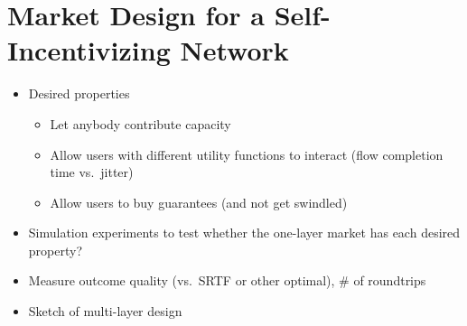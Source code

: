 \section{Market Design for a Self-Incentivizing Network}
\label{sec:designs}

\begin{itemize}

\item Desired properties

\begin{itemize}

\item Let anybody contribute capacity

\item Allow users with different utility functions to interact (flow completion time vs.~jitter)

\item Allow users to buy guarantees (and not get swindled)

\end{itemize}

\item Simulation experiments to test whether the one-layer market has each desired property?

\item Measure outcome quality (vs.~SRTF or other optimal), \# of roundtrips

\item Sketch of multi-layer design

\end{itemize}
